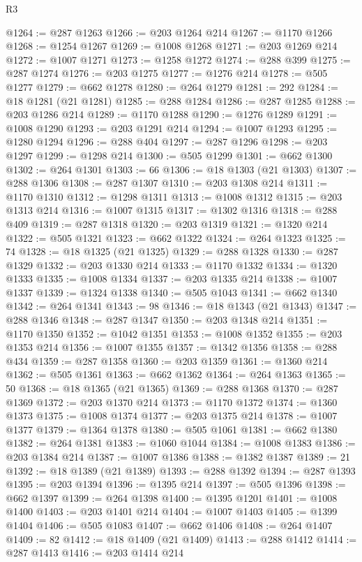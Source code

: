 \begin{lexlean}{R3}
\begin{coremodule}
@1264 := @287 @1263
@1266 := @203 @1264 @214
@1267 := @1170 @1266
@1268 := @1254 @1267
@1269 := @1008 @1268
@1271 := @203 @1269 @214
@1272 := @1007 @1271
@1273 := @1258 @1272
@1274 := @288 @399
@1275 := @287 @1274
@1276 := @203 @1275
@1277 := @1276 @214
@1278 := @505 @1277
@1279 := @662 @1278
@1280 := @264 @1279
@1281 := 292
@1284 := @18 @1281 (@21 @1281)
@1285 := @288 @1284
@1286 := @287 @1285
@1288 := @203 @1286 @214
@1289 := @1170 @1288
@1290 := @1276 @1289
@1291 := @1008 @1290
@1293 := @203 @1291 @214
@1294 := @1007 @1293
@1295 := @1280 @1294
@1296 := @288 @404
@1297 := @287 @1296
@1298 := @203 @1297
@1299 := @1298 @214
@1300 := @505 @1299
@1301 := @662 @1300
@1302 := @264 @1301
@1303 := 66
@1306 := @18 @1303 (@21 @1303)
@1307 := @288 @1306
@1308 := @287 @1307
@1310 := @203 @1308 @214
@1311 := @1170 @1310
@1312 := @1298 @1311
@1313 := @1008 @1312
@1315 := @203 @1313 @214
@1316 := @1007 @1315
@1317 := @1302 @1316
@1318 := @288 @409
@1319 := @287 @1318
@1320 := @203 @1319
@1321 := @1320 @214
@1322 := @505 @1321
@1323 := @662 @1322
@1324 := @264 @1323
@1325 := 74
@1328 := @18 @1325 (@21 @1325)
@1329 := @288 @1328
@1330 := @287 @1329
@1332 := @203 @1330 @214
@1333 := @1170 @1332
@1334 := @1320 @1333
@1335 := @1008 @1334
@1337 := @203 @1335 @214
@1338 := @1007 @1337
@1339 := @1324 @1338
@1340 := @505 @1043
@1341 := @662 @1340
@1342 := @264 @1341
@1343 := 98
@1346 := @18 @1343 (@21 @1343)
@1347 := @288 @1346
@1348 := @287 @1347
@1350 := @203 @1348 @214
@1351 := @1170 @1350
@1352 := @1042 @1351
@1353 := @1008 @1352
@1355 := @203 @1353 @214
@1356 := @1007 @1355
@1357 := @1342 @1356
@1358 := @288 @434
@1359 := @287 @1358
@1360 := @203 @1359
@1361 := @1360 @214
@1362 := @505 @1361
@1363 := @662 @1362
@1364 := @264 @1363
@1365 := 50
@1368 := @18 @1365 (@21 @1365)
@1369 := @288 @1368
@1370 := @287 @1369
@1372 := @203 @1370 @214
@1373 := @1170 @1372
@1374 := @1360 @1373
@1375 := @1008 @1374
@1377 := @203 @1375 @214
@1378 := @1007 @1377
@1379 := @1364 @1378
@1380 := @505 @1061
@1381 := @662 @1380
@1382 := @264 @1381
@1383 := @1060 @1044
@1384 := @1008 @1383
@1386 := @203 @1384 @214
@1387 := @1007 @1386
@1388 := @1382 @1387
@1389 := 21
@1392 := @18 @1389 (@21 @1389)
@1393 := @288 @1392
@1394 := @287 @1393
@1395 := @203 @1394
@1396 := @1395 @214
@1397 := @505 @1396
@1398 := @662 @1397
@1399 := @264 @1398
@1400 := @1395 @1201
@1401 := @1008 @1400
@1403 := @203 @1401 @214
@1404 := @1007 @1403
@1405 := @1399 @1404
@1406 := @505 @1083
@1407 := @662 @1406
@1408 := @264 @1407
@1409 := 82
@1412 := @18 @1409 (@21 @1409)
@1413 := @288 @1412
@1414 := @287 @1413
@1416 := @203 @1414 @214

\end{coremodule}
\end{lexlean}
